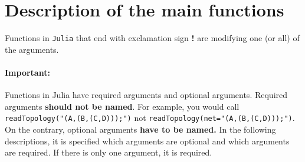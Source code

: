 \documentclass[12pt]{article}
\begin{document}
\section{Description of the main functions}
Functions in \texttt{Julia} that end with exclamation sign \textbf{!}
are modifying one (or all) of the arguments.
\paragraph{Important:} Functions in Julia have required arguments and
optional arguments. Required arguments \textbf{should not be
  named}. For example, you would call\\
\texttt{readTopology("(A,(B,(C,D)));")} not
\texttt{readTopology(net="(A,(B,(C,D)));")}. On the contrary, optional
arguments \textbf{have to be named.}
In the following descriptions, it is specified which arguments are
optional and which arguments are required. If there is only one
argument, it is required.
\end{document}
